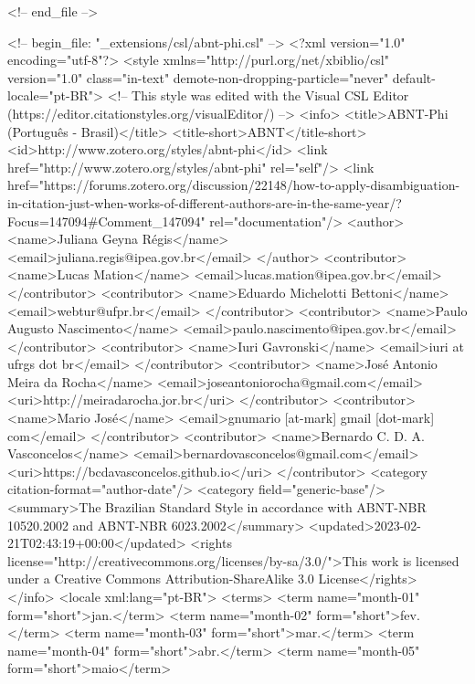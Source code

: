 <!-- end_file -->
  
<!-- begin_file: "_extensions/csl/abnt-phi.csl" -->
<?xml version="1.0" encoding="utf-8"?>
<style xmlns="http://purl.org/net/xbiblio/csl" version="1.0" class="in-text" demote-non-dropping-particle="never" default-locale="pt-BR">
  <!-- This style was edited with the Visual CSL Editor (https://editor.citationstyles.org/visualEditor/) -->
  <info>
    <title>ABNT-Phi (Português - Brasil)</title>
    <title-short>ABNT</title-short>
    <id>http://www.zotero.org/styles/abnt-phi</id>
    <link href="http://www.zotero.org/styles/abnt-phi" rel="self"/>
    <link href="https://forums.zotero.org/discussion/22148/how-to-apply-disambiguation-in-citation-just-when-works-of-different-authors-are-in-the-same-year/?Focus=147094#Comment_147094" rel="documentation"/>
    <author>
      <name>Juliana Geyna Régis</name>
      <email>juliana.regis@ipea.gov.br</email>
    </author>
    <contributor>
      <name>Lucas Mation</name>
      <email>lucas.mation@ipea.gov.br</email>
    </contributor>
    <contributor>
      <name>Eduardo Michelotti Bettoni</name>
      <email>webtur@ufpr.br</email>
    </contributor>
    <contributor>
      <name>Paulo Augusto Nascimento</name>
      <email>paulo.nascimento@ipea.gov.br</email>
    </contributor>
    <contributor>
      <name>Iuri Gavronski</name>
      <email>iuri at ufrgs dot br</email>
    </contributor>
    <contributor>
      <name>José Antonio Meira da Rocha</name>
      <email>joseantoniorocha@gmail.com</email>
      <uri>http://meiradarocha.jor.br</uri>
    </contributor>
    <contributor>
      <name>Mario José</name>
      <email>gnumario [at-mark] gmail [dot-mark] com</email>
    </contributor>
    <contributor>
      <name>Bernardo C. D. A. Vasconcelos</name>
      <email>bernardovasconcelos@gmail.com</email>
      <uri>https://bcdavasconcelos.github.io</uri>
    </contributor>
    <category citation-format="author-date"/>
    <category field="generic-base"/>
    <summary>The Brazilian Standard Style in accordance with ABNT-NBR 10520.2002 and ABNT-NBR 6023.2002</summary>
    <updated>2023-02-21T02:43:19+00:00</updated>
    <rights license="http://creativecommons.org/licenses/by-sa/3.0/">This work is licensed under a Creative Commons Attribution-ShareAlike 3.0 License</rights>
  </info>
  <locale xml:lang="pt-BR">
    <terms>
      <term name="month-01" form="short">jan.</term>
      <term name="month-02" form="short">fev.</term>
      <term name="month-03" form="short">mar.</term>
      <term name="month-04" form="short">abr.</term>
      <term name="month-05" form="short">maio</term>
